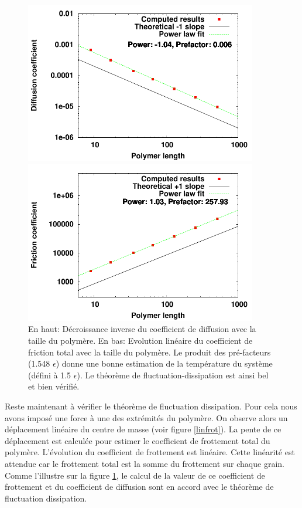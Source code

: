 \begin{figure}[H]
\begin{center}
\includegraphics[width=0.9\textwidth]{diffusioncoefficient.pdf}

\includegraphics[width=0.9\textwidth]{penteforce.pdf}

\caption[Résultats numériques: évolution des coefficients de diffusion et de friction]{En haut: Décroissance inverse du coefficient de diffusion avec la taille du polymère. En bas: Evolution linéaire du coefficient de friction total avec la taille du polymère.  Le produit des pré-facteurs (1.548 $\epsilon$) donne une bonne estimation de la température du système (défini à 1.5 $\epsilon$). Le théorème de fluctuation-dissipation est ainsi bel et bien vérifié. }
\label{fluctu-dissip}
\end{center}
\end{figure}



Reste maintenant à vérifier le théorème de fluctuation dissipation. Pour cela nous avons imposé une force à une des extrémités du polymère. On observe alors un déplacement linéaire du centre de masse (voir figure \ref{linfrot}). La pente de ce déplacement est calculée pour estimer le coefficient de frottement total du polymère. L'évolution du coefficient de frottement est linéaire. Cette linéarité est attendue car le frottement total est la somme du frottement sur chaque grain. Comme l'illustre sur la figure \ref{fluctu-dissip}, le calcul de la valeur de ce coefficient de frottement et du coefficient de diffusion sont en accord avec le théorème de fluctuation dissipation.

